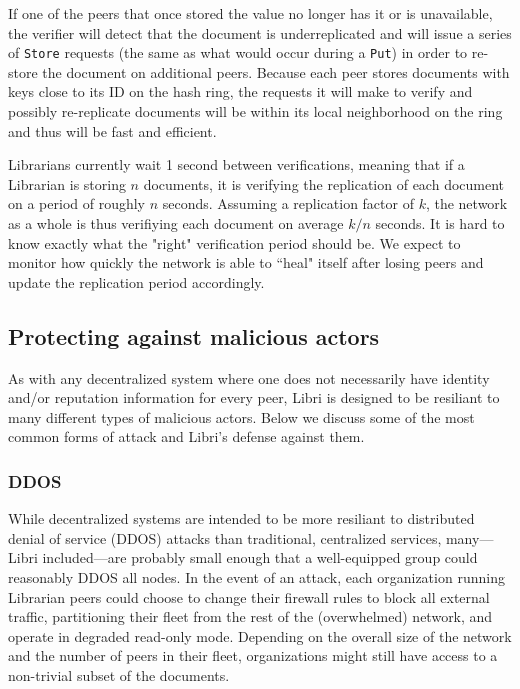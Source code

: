 \documentclass[10pt]{article}
\newcommand{\ttt}[1]{\texttt{#1}}
\begin{document}
If one of the peers that once stored the value no longer has it or is unavailable, the verifier will detect that the document is underreplicated and will issue a series of \ttt{Store} requests (the same as what would occur during a \texttt{Put}) in order to re-store the document on additional peers. Because each peer stores documents with keys close to its ID on the hash ring, the requests it will make to verify and possibly re-replicate documents will be within its local neighborhood on the ring and thus will be fast and efficient.

Librarians currently wait 1 second between verifications, meaning that if a Librarian is storing $n$ documents, it is verifying the replication of each document on a period of roughly $n$ seconds. Assuming a replication factor of $k$, the network as a whole is thus verifiying each document on average $k/n$ seconds. It is hard to know exactly what the "right" verification period should be. We expect to monitor how quickly the network is able to ``heal" itself after losing peers and update the replication period accordingly.

\subsection{Protecting against malicious actors}

As with any decentralized system where one does not necessarily have identity and/or reputation information for every peer, Libri is designed to be resiliant to many different types of malicious actors. Below we discuss some of the most common forms of attack and Libri's defense against them. 

\subsubsection{DDOS}
While decentralized systems are intended to be more resiliant to distributed denial of service (DDOS) attacks than traditional, centralized services, many---Libri included---are probably small enough that a well-equipped group could reasonably DDOS all nodes. In the event of an attack, each organization running Librarian peers could choose to change their firewall rules to block all external traffic, partitioning their fleet from the rest of the (overwhelmed) network, and operate in degraded read-only mode. Depending on the overall size of the network and the number of peers in their fleet, organizations might still have access to a non-trivial subset of the documents.
\end{document}
